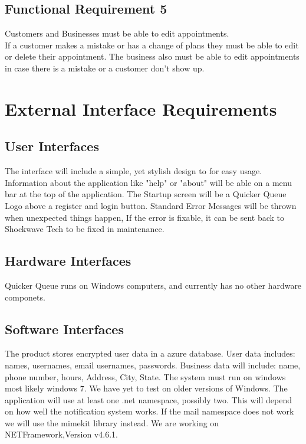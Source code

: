 \documentclass{scrreprt}
\begin{document}
\subsection{Functional Requirement 5}
Customers and Businesses must be able to edit appointments.\\ If a customer makes a mistake or has a change of plans they must be able to edit or delete their appointment. The business also must be able to edit appointments in case there is a mistake or a customer don't show up.

\section{External Interface Requirements}

\subsection{User Interfaces}

The interface will include  a simple, yet stylish design to for easy usage. Information about the application like "help" or "about" will be able 
on a menu bar at the top of the application. The Startup screen will be a Quicker Queue Logo above a register and login button. Standard Error Messages will be thrown
when unexpected things happen, If the error is fixable, it can be sent back to Shockwave Tech to be fixed in maintenance.


\subsection{Hardware Interfaces}
Quicker Queue runs on Windows computers, and currently has no other hardware componets.

\subsection{Software Interfaces}
The product stores encrypted user data in a azure database. User data includes: names, usernames, email usernames, passwords. Business data will include: name, phone number, hours, Address, City, State. The system must run on windows most likely windows 7. We have yet to test on older versions of Windows.
The application will use at least one .net namespace, possibly two. This will depend on how well the notification system works. If the mail namespace does not work we will use the mimekit library instead. We are working on NETFramework,Version v4.6.1.
\end{document}

